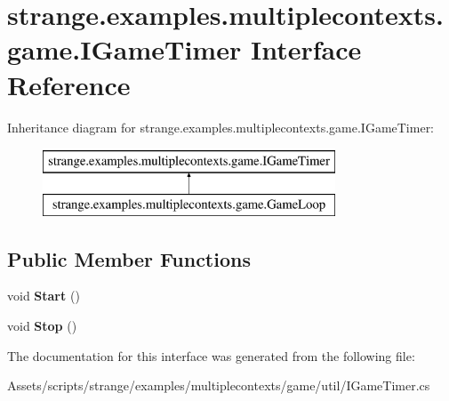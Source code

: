 \hypertarget{interfacestrange_1_1examples_1_1multiplecontexts_1_1game_1_1_i_game_timer}{\section{strange.\-examples.\-multiplecontexts.\-game.\-I\-Game\-Timer Interface Reference}
\label{interfacestrange_1_1examples_1_1multiplecontexts_1_1game_1_1_i_game_timer}
}
Inheritance diagram for strange.\-examples.\-multiplecontexts.\-game.\-I\-Game\-Timer\-:\begin{figure}[H]
\begin{center}
\leavevmode
\includegraphics[height=2.000000cm]{interfacestrange_1_1examples_1_1multiplecontexts_1_1game_1_1_i_game_timer}
\end{center}
\end{figure}
\subsection*{Public Member Functions}
\begin{DoxyCompactItemize}
\item 
\hypertarget{interfacestrange_1_1examples_1_1multiplecontexts_1_1game_1_1_i_game_timer_a815af8e74cac2825bf79c527a69a42d2}{void {\bfseries Start} ()}\label{interfacestrange_1_1examples_1_1multiplecontexts_1_1game_1_1_i_game_timer_a815af8e74cac2825bf79c527a69a42d2}

\item 
\hypertarget{interfacestrange_1_1examples_1_1multiplecontexts_1_1game_1_1_i_game_timer_a4bc6947ea026f60faad6cc832a8f8392}{void {\bfseries Stop} ()}\label{interfacestrange_1_1examples_1_1multiplecontexts_1_1game_1_1_i_game_timer_a4bc6947ea026f60faad6cc832a8f8392}

\end{DoxyCompactItemize}


The documentation for this interface was generated from the following file\-:\begin{DoxyCompactItemize}
\item 
Assets/scripts/strange/examples/multiplecontexts/game/util/I\-Game\-Timer.\-cs\end{DoxyCompactItemize}

